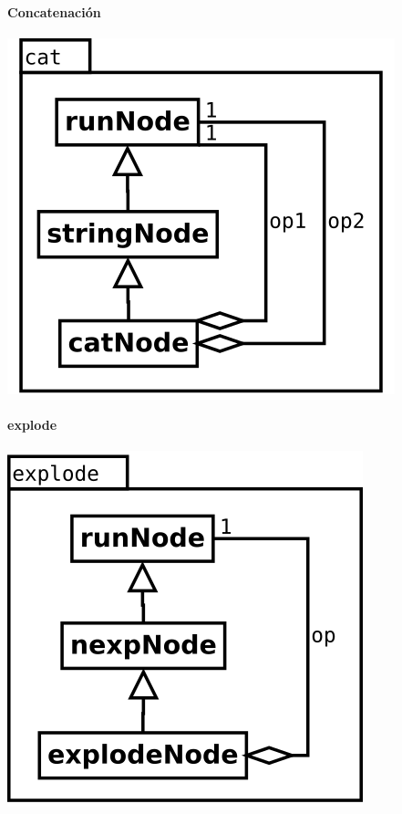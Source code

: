 \paragraph {Concatenación}
\begin{center}
\includegraphics[scale=0.4]{cat.png} \\
\end{center}

\paragraph {explode}
\begin{center}
\includegraphics[scale=0.4]{explode.png} \\
\end{center}

